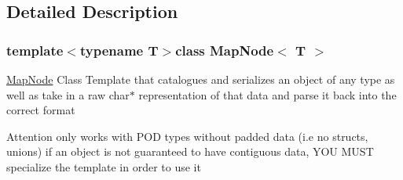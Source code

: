 \subsection{Detailed Description}
\subsubsection*{template$<$typename T$>$class Map\+Node$<$ T $>$}

\hyperlink{classMapNode}{Map\+Node} Class  Template that catalogues and serializes an object of any type as well as take in a raw char$\ast$ representation of that data and parse it back into the correct format \begin{DoxyAttention}{Attention}
only works with P\+O\+D types without padded data (i.\+e no structs, unions) if an object is not guaranteed to have contiguous data, Y\+O\+U M\+U\+S\+T specialize the template in order to use it 
\end{DoxyAttention}


